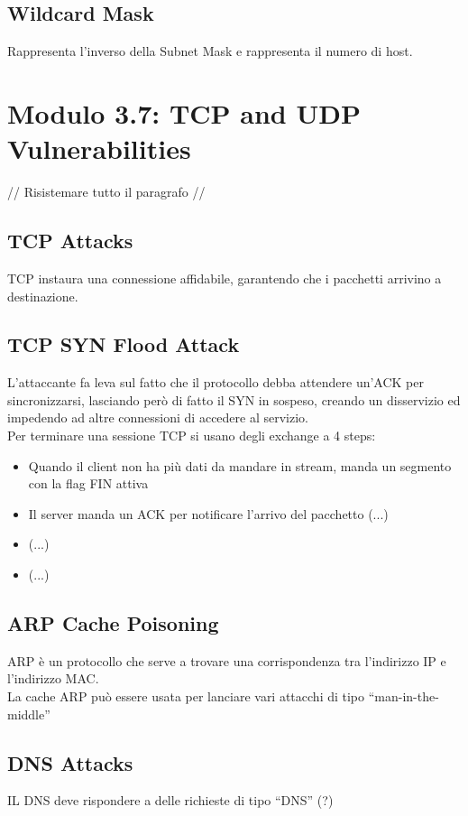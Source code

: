 \documentclass[12pt, a4paper]{article}
\begin{document}
	\subsection*{Wildcard Mask}
	
	Rappresenta l'inverso della Subnet Mask e rappresenta il numero di host.
	
	
	\section*{Modulo 3.7: TCP and UDP Vulnerabilities}
	// Risistemare tutto il paragrafo //
	\subsection*{TCP Attacks}
	TCP instaura una connessione affidabile, garantendo che i pacchetti arrivino a destinazione. \\
	\subsection*{TCP SYN Flood Attack}
	L'attaccante fa leva sul fatto che il protocollo debba attendere un'ACK per sincronizzarsi, lasciando però di fatto il SYN in sospeso, creando un disservizio ed impedendo ad altre connessioni di accedere al servizio. \\
	Per terminare una sessione TCP si usano degli exchange a 4 steps:
	\begin{itemize}
		\item Quando il client non ha più dati da mandare in stream, manda un segmento con la flag FIN attiva
		\item Il server manda un ACK per notificare l'arrivo del pacchetto (...)
		\item (...)
		\item (...)
	\end{itemize}

	\subsection*{ARP Cache Poisoning}
	ARP è un protocollo che serve a trovare una corrispondenza tra l'indirizzo IP e l'indirizzo MAC. \\ 
	La cache ARP può essere usata per lanciare vari attacchi di tipo ``man-in-the-middle''
	
	\subsection*{DNS Attacks}
	IL DNS deve rispondere a delle richieste di tipo ``DNS'' (?)
\end{document}
